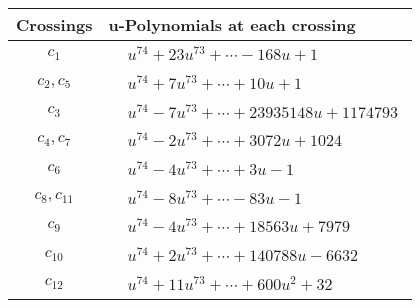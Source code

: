 \documentclass[1p]{elsarticle_modified}
\theoremstyle{definition}
\begin{document}
\begin{tabular}{m{50pt}|m{274pt}}
Crossings & \hspace{64pt}u-Polynomials at each crossing \\
\hline $$\begin{aligned}c_{1}\end{aligned}$$&$\begin{aligned}
&u^{74}+23 u^{73}+\cdots-168 u+1
\end{aligned}$\\
\hline $$\begin{aligned}c_{2},c_{5}\end{aligned}$$&$\begin{aligned}
&u^{74}+7 u^{73}+\cdots+10 u+1
\end{aligned}$\\
\hline $$\begin{aligned}c_{3}\end{aligned}$$&$\begin{aligned}
&u^{74}-7 u^{73}+\cdots+23935148 u+1174793
\end{aligned}$\\
\hline $$\begin{aligned}c_{4},c_{7}\end{aligned}$$&$\begin{aligned}
&u^{74}-2 u^{73}+\cdots+3072 u+1024
\end{aligned}$\\
\hline $$\begin{aligned}c_{6}\end{aligned}$$&$\begin{aligned}
&u^{74}-4 u^{73}+\cdots+3 u-1
\end{aligned}$\\
\hline $$\begin{aligned}c_{8},c_{11}\end{aligned}$$&$\begin{aligned}
&u^{74}-8 u^{73}+\cdots-83 u-1
\end{aligned}$\\
\hline $$\begin{aligned}c_{9}\end{aligned}$$&$\begin{aligned}
&u^{74}-4 u^{73}+\cdots+18563 u+7979
\end{aligned}$\\
\hline $$\begin{aligned}c_{10}\end{aligned}$$&$\begin{aligned}
&u^{74}+2 u^{73}+\cdots+140788 u-6632
\end{aligned}$\\
\hline $$\begin{aligned}c_{12}\end{aligned}$$&$\begin{aligned}
&u^{74}+11 u^{73}+\cdots+600 u^2+32
\end{aligned}$\\
\hline
\end{tabular}\\~\\
\end{document}
